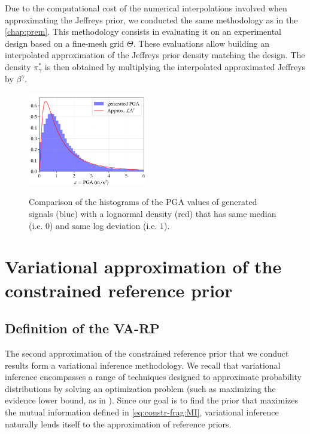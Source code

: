 Due to the computational cost of the numerical interpolations involved when approximating the Jeffreys prior, we conducted the same methodology as in the \cref{chap:prem}. This methodology consists in evaluating it on an experimental design based on a fine-mesh grid $\Theta$. These evaluations allow building an interpolated approximation of the Jeffreys prior density matching the design.
The density $\pi^\ast_\gamma$ is then obtained by multiplying the interpolated approximated Jeffreys by $\beta^\gamma$.

\begin{figure}[h]
    \centering
    \includegraphics[width=5.2cm]{figures/constr-frags/pgadistrib.pdf}
    \label{fig:constr-frags:PGA}
    \caption{%
    Comparison of the histograms of the PGA values of generated signals (blue) with a lognormal
    density (red) that has same median (i.e. $0$) and same log deviation (i.e. $1$).}
\end{figure}





\section{Variational approximation of the constrained reference prior}\label{sec:constr-frags:varp}


\subsection{Definition of the VA-RP}\label{sec:constr-frags:subsec:varpdef}

The second approximation of the constrained reference prior that we conduct results form a variational inference methodology.
We recall that
variational inference encompasses a range of techniques designed to approximate probability distributions by solving an optimization problem (such as maximizing the evidence lower bound, as in \cite{kingma_auto-encoding_2014}). 
Since our goal is to find
the prior that maximizes the mutual information defined in \cref{eq:constr-frag:MI}, variational inference naturally lends itself to the approximation of reference priors.  

